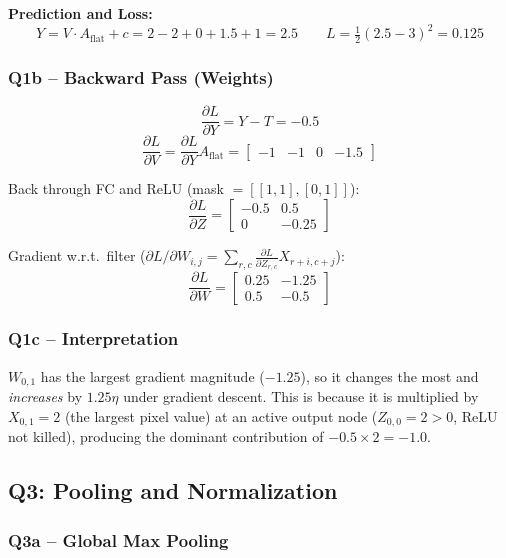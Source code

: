 \documentclass[12pt,a4paper]{article}
\begin{document}
\textbf{Prediction and Loss:}
\[
Y = V \cdot A_\text{flat} + c = 2 - 2 + 0 + 1.5 + 1 = \boxed{2.5}
\qquad
L = \tfrac{1}{2}(2.5-3)^2 = \boxed{0.125}
\]

\subsubsection*{Q1b – Backward Pass (Weights)}

\[
\frac{\partial L}{\partial Y} = Y - T = -0.5
\]
\[
\frac{\partial L}{\partial V} = \frac{\partial L}{\partial Y} A_\text{flat}
= \boxed{\begin{bmatrix} -1 & -1 & 0 & -1.5 \end{bmatrix}}
\]

Back through FC and ReLU (mask $= [[1,1],[0,1]]$):
\[
\frac{\partial L}{\partial Z} = \begin{bmatrix} -0.5 & 0.5 \\ 0 & -0.25 \end{bmatrix}
\]

Gradient w.r.t.\ filter ($\partial L/\partial W_{i,j} = \sum_{r,c} \frac{\partial L}{\partial Z_{r,c}} X_{r+i,c+j}$):
\[
\boxed{\frac{\partial L}{\partial W} = \begin{bmatrix} 0.25 & -1.25 \\ 0.5 & -0.5 \end{bmatrix}}
\]

\subsubsection*{Q1c – Interpretation}

$W_{0,1}$ has the largest gradient magnitude ($-1.25$), so it changes the most and \emph{increases} by $1.25\eta$ under gradient descent. This is because it is multiplied by $X_{0,1}=2$ (the largest pixel value) at an active output node ($Z_{0,0}=2>0$, ReLU not killed), producing the dominant contribution of $-0.5 \times 2 = -1.0$.

\subsection*{Q3: Pooling and Normalization}

\subsubsection*{Q3a – Global Max Pooling}
\end{document}

